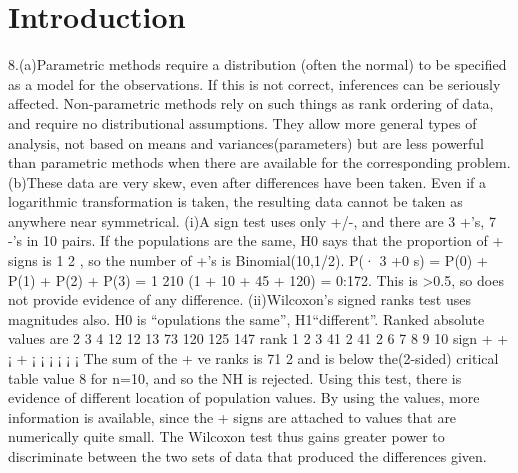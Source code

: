 \documentclass{article}
\begin{document}
\maketitle

\section{Introduction}
8.(a)Parametric methods require a distribution (often the normal) to be specified as a model for
the observations. If this is not correct, inferences can be seriously affected. Non-parametric methods
rely on such things as rank ordering of data, and require no distributional assumptions. They
allow more general types of analysis, not based on means and variances(parameters) but are less
powerful than parametric methods when there are available for the corresponding problem.
(b)These data are very skew, even after differences have been taken. Even if a logarithmic transformation
is taken, the resulting data cannot be taken as anywhere near symmetrical.
(i)A sign test uses only +/-, and there are 3 +’s, 7 -’s in 10 pairs. If the populations are the
same, H0 says that the proportion of + signs is 1
2 , so the number of +’s is Binomial(10,1/2).
P(· 3 +0 s) = P(0) + P(1) + P(2) + P(3) = 1
210 (1 + 10 + 45 + 120) = 0:172.
This is >0.5, so does not provide evidence of any difference.
(ii)Wilcoxon’s signed ranks test uses magnitudes also.
H0 is “opulations the same”, H1“different”. Ranked absolute values
are 2 3 4 12 12 13 73 120 125 147
rank 1 2 3 41
2 41
2 6 7 8 9 10
sign + + ¡ + ¡ ¡ ¡ ¡ ¡ ¡
The sum of the + ve ranks is 71
2 and is below the(2-sided) critical table value 8 for n=10,
and so the NH is rejected. Using this test, there is evidence of different location of population
values.
By using the values, more information is available, since the + signs are attached to values
that are numerically quite small. The Wilcoxon test thus gains greater power to discriminate between
the two sets of data that produced the differences given.
\end{document}
